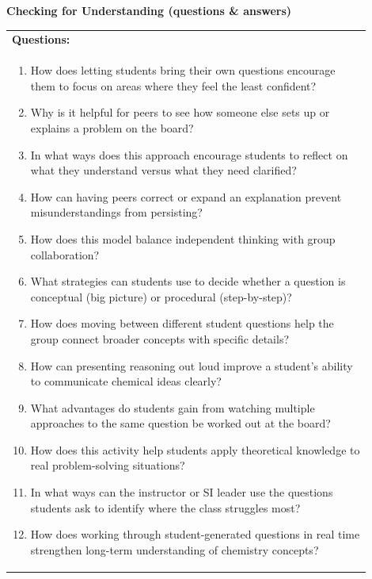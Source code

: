 \documentclass{article}
\begin{document}
{\newpage
\noindent
{\large\textbf{Checking for Understanding (questions \& answers)}}\\[0.2em]
\noindent
\begin{tabular}{|p{0.9\linewidth}|}
\hline
\textbf{Questions:} \\
\begin{enumerate}
    \item How does letting students bring their own questions encourage them to focus on areas where they feel the least confident?  
    \item Why is it helpful for peers to see how someone else sets up or explains a problem on the board?  
    \item In what ways does this approach encourage students to reflect on what they understand versus what they need clarified?  
    \item How can having peers correct or expand an explanation prevent misunderstandings from persisting?  
    \item How does this model balance independent thinking with group collaboration?  
    \item What strategies can students use to decide whether a question is conceptual (big picture) or procedural (step-by-step)?  
    \item How does moving between different student questions help the group connect broader concepts with specific details?  
    \item How can presenting reasoning out loud improve a student’s ability to communicate chemical ideas clearly?  
    \item What advantages do students gain from watching multiple approaches to the same question be worked out at the board?  
    \item How does this activity help students apply theoretical knowledge to real problem-solving situations?  
    \item In what ways can the instructor or SI leader use the questions students ask to identify where the class struggles most?  
    \item How does working through student-generated questions in real time strengthen long-term understanding of chemistry concepts?  
\end{enumerate}

\hline  
\end{tabular}

\newpage
\noindent
}
\end{document}
